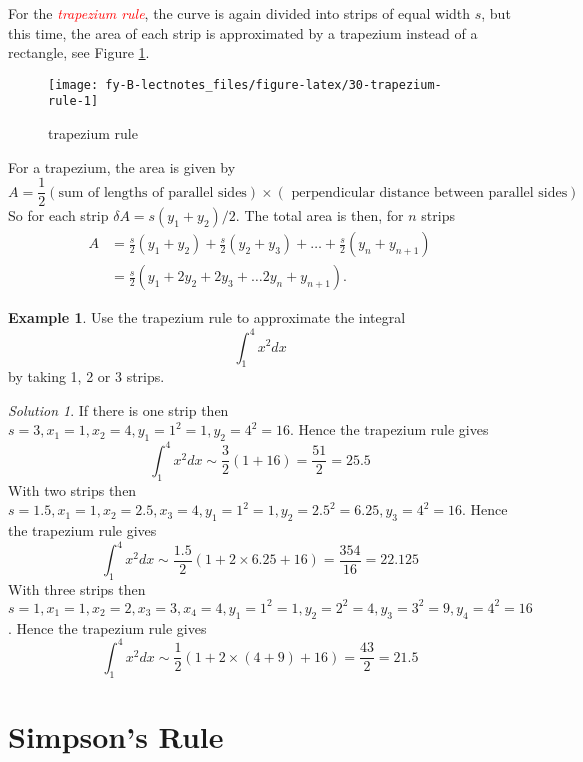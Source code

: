 \documentclass[
  11pt,
  oneside]{book}
\newcommand{\slide}{}
\theoremstyle{definition}
\theoremstyle{definition}
\newtheorem{example}{Example}[chapter]
\theoremstyle{definition}
\theoremstyle{definition}
\theoremstyle{remark}
\newtheorem*{solution}{Solution}
\begin{document}
For the \textcolor{red}{\em trapezium rule}, the curve is again divided into strips of equal width \(s\), but this time, the area of each strip is approximated by a trapezium instead of a rectangle, see Figure \ref{fig:30-trapezium-rule}.

\begin{figure}

{\centering \texttt{[image: fy-B-lectnotes\_files/figure-latex/30-trapezium-rule-1]} 

}

\caption{trapezium rule}\label{fig:30-trapezium-rule}
\end{figure}

For a trapezium, the area is given by
\[
A =\frac12(\text{sum of lengths of parallel sides}) \times(\text{ perpendicular distance between parallel sides})
\]
So for each strip \(\delta A =s(y_1+y_2)/2\). The total area is then, for \(n\) strips
\begin{align*}
A& = \frac s2(y_1+y_2) + \frac s2(y_2+y_3) + \ldots + \frac s2(y_{n}+y_{n+1})\\
&= \frac s2\left(y_1+2y_2+2y_3+\ldots 2y_{n}+y_{n+1}\right).
\end{align*}

\slide

\begin{example}
Use the trapezium rule to approximate the integral
\[
\int_1^4x^2dx
\]
by taking 1, 2 or 3 strips.
\end{example}

\begin{solution}
If there is one strip then \(s=3, x_1=1, x_2 = 4, y_1=1^2=1, y_2=4^2=16\). Hence the trapezium rule gives
\[
\int_1^4 x^2 dx \sim \frac32\left(1+16\right) = \frac{51}{2} = 25.5
\]
With two strips then \(s=1.5,x_1=1, x_2=2.5, x_3=4, y_1=1^2=1, y_2=2.5^2=6.25, y_3=4^2=16\). Hence the trapezium rule gives
\[
\int_1^4 x^2 dx \sim \frac{1.5}2\left(1+2\times6.25+16\right) = \frac{354}{16} = 22.125
\]
With three strips then \(s=1,x_1=1, x_2=2, x_3 = 3, x_4=4, y_1=1^2=1, y_2=2^2=4, y_3=3^2=9, y_4=4^2=16\). Hence the trapezium rule gives
\[
\int_1^4 x^2 dx \sim \frac{1}2\left(1+2\times(4+9)+16\right) = \frac{43}{2} = 21.5
\]
\end{solution}

\section{Simpson's Rule}\label{simpsons-rule}
\end{document}

